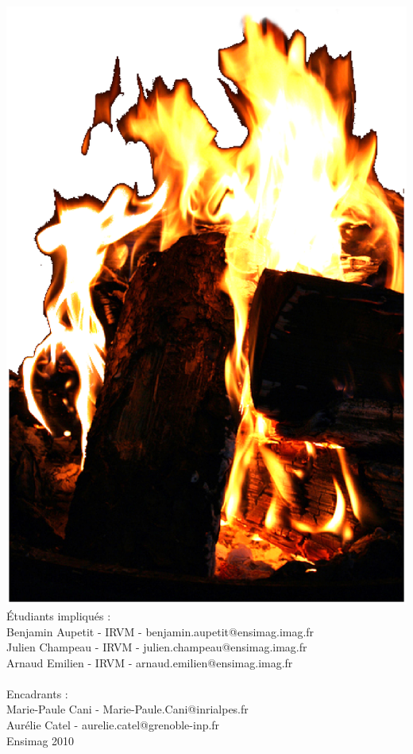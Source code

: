 \documentclass[a4paper,10pt]{article}
\begin{document}
\begin{center}
	\includegraphics[scale=0.3]{feu.ps}\\
	\vspace{2cm}
	Étudiants impliqués :\\
	Benjamin Aupetit - IRVM - benjamin.aupetit@ensimag.imag.fr\\
	Julien Champeau - IRVM - julien.champeau@ensimag.imag.fr\\
	Arnaud Emilien - IRVM - arnaud.emilien@ensimag.imag.fr\\
	~\\
	Encadrants :\\
	Marie-Paule Cani  -  Marie-Paule.Cani@inrialpes.fr \\
	Aurélie Catel - aurelie.catel@grenoble-inp.fr
	~ \\
	\vspace{3mm}
	Ensimag 2010\\

\end{center}
\end{document}

